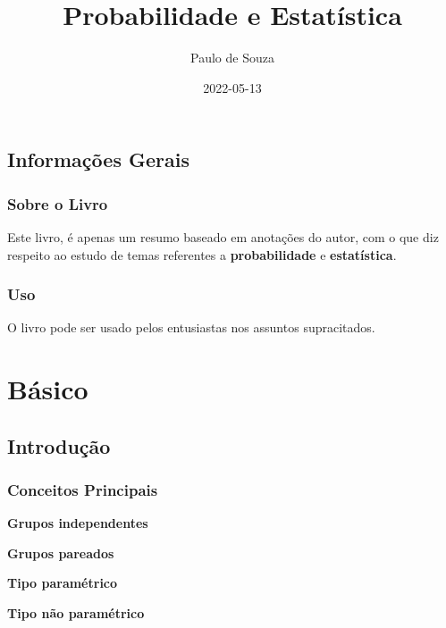 \documentclass[
]{book}
\title{Probabilidade e Estatística}
\author{Paulo de Souza}
\date{2022-05-13}
\begin{document}
\maketitle

{
\setcounter{tocdepth}{1}
\tableofcontents
}
\hypertarget{informauxe7uxf5es-gerais}{%
\chapter*{Informações Gerais}\label{informauxe7uxf5es-gerais}}

\hypertarget{sobre-o-livro}{%
\section*{Sobre o Livro}\label{sobre-o-livro}}

Este livro, é apenas um resumo baseado em anotações do autor, com o que diz respeito ao estudo de temas referentes a \textbf{probabilidade} e \textbf{estatística}.

\hypertarget{uso}{%
\section*{Uso}\label{uso}}

O livro pode ser usado pelos entusiastas nos assuntos supracitados.

\hypertarget{part-buxe1sico}{%
\part{Básico}\label{part-buxe1sico}}

\hypertarget{introduuxe7uxe3o}{%
\chapter{Introdução}\label{introduuxe7uxe3o}}

\hypertarget{conceitos-principais}{%
\section{Conceitos Principais}\label{conceitos-principais}}

\textbf{Grupos independentes}

\textbf{Grupos pareados}

\textbf{Tipo paramétrico}

\textbf{Tipo não paramétrico}
\end{document}
